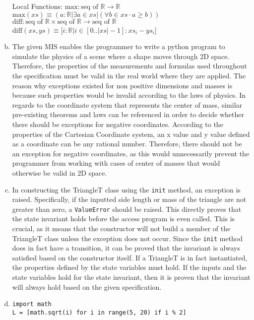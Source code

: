 \documentclass[12pt]{article}
\begin{document}
\begin{enumerate}[a)]
Local Functions:
\newline
\newline
\noindent $\text{max}: \text{seq of } \mathbb{R} \rightarrow \mathbb{R}$\\
\noindent $\text{max}(xs) \equiv (a: \mathbb{R} | \exists a \in xs | (\forall b \in xs \cdot a \ge b))$\\

\noindent $\text{diff}: \text{seq of } \mathbb{R} \times \text{seq of } \mathbb{R}
\rightarrow \text{seq of } \mathbb{R}$\\
\noindent $\text{diff}(xs, ys) \equiv [i: \mathbb{R} | i \in [0..|xs|-1] : xs_i - ys_i$]\\

\item The given MIS enables the programmer to write a python program to simulate the physics of a scene where a shape moves through 2D space. Therefore, the properties of the measurements and formulas used throughout the specification must be valid in the real world where they are applied. The reason why exceptions existed for non positive dimensions and masses is because such properties would be invalid according to the laws of physics. In regards to the coordinate system that represents the center of mass, similar pre-existing theorems and laws can be referenced in order to decide whether there should be exceptions for negative coordinates. According to the properties of the Cartesian Coordinate system, an x value and y value defined as a coordinate can be any rational number. Therefore, there should not be an exception for negative coordinates, as this would unnecessarily prevent the programmer from working with cases of center of masses that would otherwise be valid in 2D space.

\item In constructing the TriangleT class using the \texttt{init} method, an exception is raised. Specifically, if the inputted side length or mass of the triangle are not greater than zero, a \texttt{ValueError} should be raised. This directly proves that the state invariant holds before the access program is even called. This is crucial, as it means that the constructor will not build a member of the TriangleT class unless the exception does not occur. Since the \texttt{init} method does in fact have a transition, it can be proved that the invariant is always satisfied based on the constructor itself. If a TriangleT is in fact instantiated, the properties defined by the state variables must hold. If the inputs and the state variables hold for the state invariant, then it is proven that the invariant will always hold based on the given specification.   
\newpage
\item 
\begin{lstlisting} 
import math
L = [math.sqrt(i) for i in range(5, 20) if i % 2] 
\end{lstlisting} 


\end{enumerate}
\end{document}
